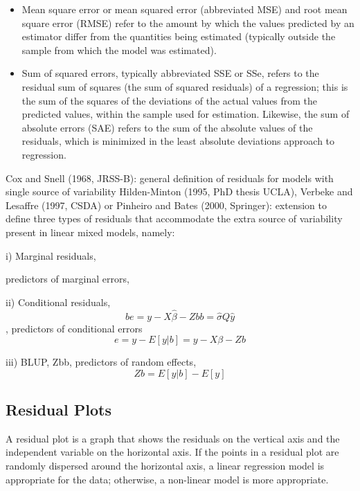 \documentclass[12pt, a4paper]{report}
\theoremstyle{plain}
\theoremstyle{definition}
\theoremstyle{remark}
\begin{document}
	\begin{itemize}
		\item Mean square error or mean squared error (abbreviated MSE) and root mean square error (RMSE) refer to the amount by which the values predicted by an estimator differ from the quantities being estimated (typically outside the sample from which the model was estimated).
		
		\item 
		Sum of squared errors, typically abbreviated SSE or SSe, refers to the residual sum of squares (the sum of squared residuals) of a regression; this is the sum of the squares of the deviations of the actual values from the predicted values, within the sample used for estimation. Likewise, the sum of absolute errors (SAE) refers to the sum of the absolute values of the residuals, which is minimized in the least absolute deviations approach to regression.
		
	\end{itemize}
	
	
	Cox and Snell (1968, JRSS-B): general definition of residuals for
	models with single source of variability
	Hilden-Minton (1995, PhD thesis UCLA), Verbeke and Lesaffre
	(1997, CSDA) or Pinheiro and Bates (2000, Springer): extension to
	define three types of residuals that accommodate the extra source of
	variability present in linear mixed models, namely:
	
	i) Marginal residuals, 
	
	predictors of marginal errors, 
	
	
	ii) Conditional residuals, 
	\[be = y − X\hat{\beta} − Zbb = \hat{\sigma}Q\hat{y}\] , predictors of
	conditional errors 
	\[e = y − E[y|b] = y − X\beta − Zb\]
	
	iii) BLUP, Zbb, predictors of random effects,
	\[ Zb = E[y|b] − E[y]\]
	
	\subsection{Residual Plots}
	A residual plot is a graph that shows the residuals on the vertical axis and the independent variable on the horizontal axis. If the points in a residual plot are randomly dispersed around the horizontal axis, a linear regression model is appropriate for the data; otherwise, a non-linear model is more appropriate.
	
\end{document}
